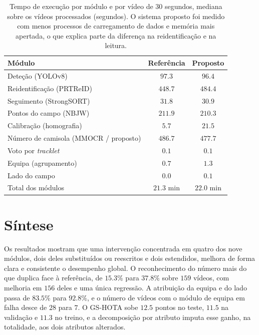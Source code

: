 \begin{table}[htbp]
    \centering
    \caption{Tempo de execução por módulo e por vídeo de $30$ segundos, mediana sobre os vídeos
    processados (segundos). O sistema proposto foi medido com menos processos de carregamento de
    dados e memória mais apertada, o que explica parte da diferença na reidentificação e na leitura.}
    \label{tab:tempos}
    \begin{tabular}{|l|c|c|}
        \hline
        \textbf{Módulo} & \textbf{Referência} & \textbf{Proposto} \\
        \hline
        Deteção (YOLOv8)                          & $97.3$  & $96.4$ \\
        \hline
        Reidentificação (PRTReID)                 & $448.7$ & $484.4$ \\
        \hline
        Seguimento (StrongSORT)                   & $31.8$  & $30.9$ \\
        \hline
        Pontos do campo (NBJW)                    & $211.9$ & $210.3$ \\
        \hline
        Calibração (homografia)                   & $5.7$   & $21.5$ \\
        \hline
        Número de camisola (MMOCR / proposto)     & $486.7$ & $477.7$ \\
        \hline
        Voto por \emph{tracklet}                  & $0.1$   & $0.1$ \\
        \hline
        Equipa (agrupamento)                      & $0.7$   & $1.3$ \\
        \hline
        Lado do campo                             & $0.0$   & $0.1$ \\
        \hline
        Total dos módulos                         & $21.3$ min & $22.0$ min \\
        \hline
    \end{tabular}
\end{table}

\section{Síntese}\label{sec:res_sintese}

Os resultados mostram que uma intervenção concentrada em quatro dos nove módulos, dois deles
substituídos ou reescritos e dois estendidos, melhora de forma clara e consistente o desempenho
global. O reconhecimento do número mais do que duplica face à referência, de $15.3\%$ para
$37.8\%$ sobre $159$ vídeos, com melhoria em $156$ deles e uma única regressão. A
atribuição da equipa e do lado passa de $83.5\%$ para $92.8\%$, e o número de vídeos
com o módulo de equipa em falha desce de $28$ para $7$. O GS-HOTA sobe
$12.5$ pontos no teste, $11.5$ na validação e $11.3$ no treino, e a
decomposição por atributo imputa esse ganho, na totalidade, aos dois atributos alterados.

